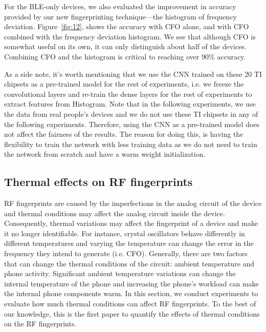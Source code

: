 For the BLE-only devices, we also evaluated the improvement in accuracy
provided by our new fingerprinting technique---the histogram of frequency
deviation.  Figure~\ref{fig:12}, shows the accuracy with CFO alone, and with
CFO combined with the frequency deviation histogram.  We see that although
CFO is somewhat useful on its own, it can only distinguish about half of the
devices. Combining CFO and the histogram is critical to reaching over 90\%
accuracy.


As a side note, it's worth mentioning that we use the CNN trained on these 20
TI chipsets as a pre-trained model for the rest of experiments, i.e. we freeze
the convolutional layers and re-train the dense layers for the rest of
experiments to extract features from Histogram. Note that in the following
experiments, we use the data from real people's devices and we do not use these
TI chipsets in any of the following experiments. Therefore, using the CNN as a
pre-trained model does not affect the fairness of the results. The reason for
doing this, is having the flexibility to train the network with less training
data as we do not need to train the network from scratch and have a warm weight initialization.




\subsection{Thermal effects on RF fingerprints}
RF fingerprints are caused by the imperfections in the analog circuit of the device and thermal conditions may affect the analog circuit inside the device. Consequently, thermal variations may affect the fingerprint of a device and make it no longer identifiable. For instance, crystal oscillators behave differently in different temperatures and varying the temperature can change the error in the frequency they intend to generate (i.e. CFO). Generally, there are two factors that can change the thermal conditions of the circuit: ambient temperature and phone activity. Significant ambient temperature variations can change the internal temperature of the phone and increasing the phone's workload can make the internal phone components warm. In this section, we conduct experiments to evaluate how much thermal conditions can affect RF fingerprints. To the best of our knowledge, this is the first paper to quantify the effects of thermal conditions on the RF fingerprints.


